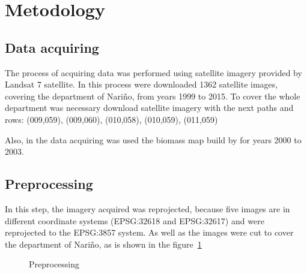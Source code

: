 
\section{Metodology}

\subsection{Data acquiring}

The process of acquiring data was performed using satellite imagery provided by Landsat 7 satellite. In this process were downloaded 1362 satellite images, covering the department of Nariño, from years 1999 to 2015. To cover the whole department was necessary download satellite imagery with the next paths and rows: (009,059), (009,060), (010,058), (010,059), (011,059)

Also, in the data acquiring was used the biomass map build by  \cite{baccini2008afirst} for years 2000 to 2003.

\subsection{Preprocessing}

In this step, the imagery acquired was reprojected, because five images are in different coordinate systems (EPSG:32618 and EPSG:32617)  and were reprojected to the EPSG:3857 system. As well as the images were cut to cover the department of Nariño, as is shown in the figure~\ref{fig:Recortar imágenes}

\begin{figure}
  \centering
  \vfill
  \caption{Preprocessing}
  \label{fig:Recortar imágenes}
\end{figure}

